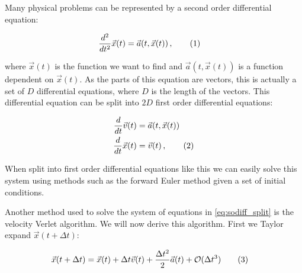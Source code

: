 \documentclass[reprint,english,notitlepage]{revtex4-1}  %
\newcommand\numberthis{\addtocounter{equation}{1}\tag{\theequation}}
\begin{document}
Many physical problems can be represented by a second order differential equation:

\begin{align*}
\frac{d^2}{dt^2} \vec{x}(t) &= \vec{a}(t,\vec{x}(t)) \, , \numberthis \label{eq:sodiff}
\end{align*}

where $\vec{x}(t)$ is the function we want to find and $\vec{a}(t,\vec{x}(t))$ is a function dependent on $\vec{x}(t)$. As the parts of this equation are vectors, this is actually a set of $D$ differential equations, where $D$ is the length of the vectors. This differential equation can be split into $2D$ first order differential equations:

\begin{align*}
\frac{d}{dt} \vec{v}(t) &= \vec{a}(t,\vec{x}(t))  \\
\frac{d}{dt} \vec{x}(t) &= \vec{v}(t) \, , \numberthis \label{eq:sodiff_split}
\end{align*}

When split into first order differential equations like this we can easily solve this system using methods such as the forward Euler method given a set of initial conditions.




Another method used to solve the system of equations in \eqref{eq:sodiff_split} is the velocity Verlet algorithm. We will now derive this algorithm. First we Taylor expand $\vec{x}(t + \Delta t)$:

\begin{align*}
\vec{x}(t + \Delta t) &= \vec{x}(t) + \Delta t \vec{v}(t) + \frac{\Delta t^2}{2} \vec{a}(t) + \mathcal{O}(\Delta t^3) \numberthis \label{eq:so_taylorx}
\end{align*}
\end{document}
